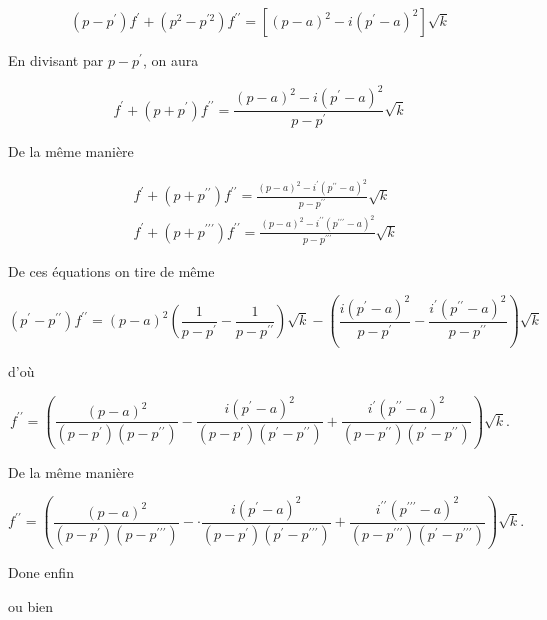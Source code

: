 \documentclass{article}
\begin{document}
\[
\left(p-p^{\prime}\right) f^{\prime}+\left(p^{2}-p^{\prime 2}\right) f^{\prime \prime}=\left[(p-a)^{2}-i\left(p^{\prime}-a\right)^{2}\right] \sqrt{k}
\]

En divisant par \(p-p^{\prime}\), on aura

\[
f^{\prime}+\left(p+p^{\prime}\right) f^{\prime \prime}=\frac{(p-a)^{2}-i\left(p^{\prime}-a\right)^{2}}{p-p^{\prime}} \sqrt{k}
\]

De la même manière

\[
\begin{aligned}
& f^{\prime}+\left(p+p^{\prime \prime}\right) f^{\prime \prime}=\frac{(p-a)^{2}-i^{\prime}\left(p^{\prime \prime}-a\right)^{2}}{p-p^{\prime \prime}} \sqrt{k} \\
& f^{\prime}+\left(p+p^{\prime \prime \prime}\right) f^{\prime \prime}=\frac{(p-a)^{2}-i^{\prime \prime}\left(p^{\prime \prime \prime}-a\right)^{2}}{p-p^{\prime \prime \prime}} \sqrt{k}
\end{aligned}
\]

De ces équations on tire de même

\[
\left(p^{\prime}-p^{\prime \prime}\right) f^{\prime \prime}=(p-a)^{2}\left(\frac{1}{p-p^{\prime}}-\frac{1}{p-p^{\prime \prime}}\right) \sqrt{k}-\left(\frac{i\left(p^{\prime}-a\right)^{2}}{p-p^{\prime}}-\frac{i^{\prime}\left(p^{\prime \prime}-a\right)^{2}}{p-p^{\prime \prime}}\right) \sqrt{k}
\]

d'où

\[
f^{\prime \prime}=\left(\frac{(p-a)^{2}}{\left(p-p^{\prime}\right)\left(p-p^{\prime \prime}\right)}-\frac{i\left(p^{\prime}-a\right)^{2}}{\left(p-p^{\prime}\right)\left(p^{\prime}-p^{\prime \prime}\right)}+\frac{i^{\prime}\left(p^{\prime \prime}-a\right)^{2}}{\left(p-p^{\prime \prime}\right)\left(p^{\prime}-p^{\prime \prime}\right)}\right) \sqrt{k} .
\]

De la même manière

\[
f^{\prime \prime}=\left(\frac{(p-a)^{2}}{\left(p-p^{\prime}\right)\left(p-p^{\prime \prime \prime}\right)}-\cdot \frac{i\left(p^{\prime}-a\right)^{2}}{\left(p-p^{\prime}\right)\left(p^{\prime}-p^{\prime \prime \prime}\right)}+\frac{i^{\prime \prime}\left(p^{\prime \prime \prime}-a\right)^{2}}{\left(p-p^{\prime \prime \prime}\right)\left(p^{\prime}-p^{\prime \prime \prime}\right)}\right) \sqrt{k} .
\]

Done enfin

ou bien
\end{document}
